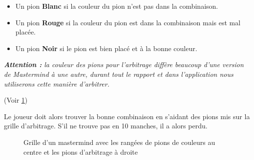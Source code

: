 \documentclass{article}
\begin{document}
\begin{itemize}

\item Un pion \textbf{Blanc} si la couleur du pion n'est pas dans la combinaison.
\item Un pion \textbf{Rouge} si la couleur du pion est dans la combinaison mais est mal placée.
\item Un pion \textbf{Noir} si le pion est bien placé et à la bonne couleur. 

\end{itemize} 
\vspace{1\baselineskip}

\textit{\textbf{Attention :} la couleur des pions pour l'arbitrage diffère beaucoup d'une version de Mastermind à une autre, durant tout le rapport et dans l'application nous utiliserons cette manière d'arbitrer. }

(Voir \ref{fig:Grille d'un mastermind avec les rangées de pions de couleurs au centre et les pions d'arbitrage à droite})

\vspace{1\baselineskip}

Le joueur doit alors trouver la bonne combinaison en s'aidant des pions mis sur la grille d'arbitrage. S'il ne trouve pas en 10 manches, il a alors perdu. 

\begin{figure}[tb!]


\caption {Grille d'un mastermind avec les rangées de pions de couleurs au centre et les pions d'arbitrage à droite \label{fig:Grille d'un mastermind avec les rangées de pions de couleurs au centre et les pions d'arbitrage à droite}}

\end{figure}
\end{document}
